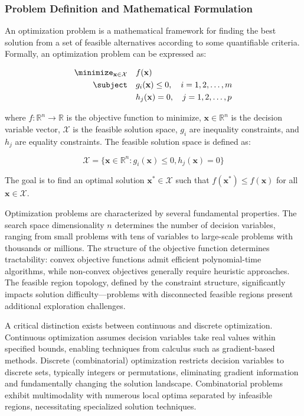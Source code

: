 \subsubsection{Problem Definition and Mathematical Formulation}

An optimization problem is a mathematical framework for finding the best solution from a set of feasible alternatives according to some quantifiable criteria. Formally, an optimization problem can be expressed as:

\begin{equation}
\begin{aligned}
\minimize_{\mathbf{x} \in \mathcal{X}} \quad & f(\mathbf{x}) \\
\subject \quad & g_i(\mathbf{x}) \leq 0, \quad i = 1, 2, \ldots, m \\
& h_j(\mathbf{x}) = 0, \quad j = 1, 2, \ldots, p
\end{aligned}
\end{equation}

where $f: \mathbb{R}^n \to \mathbb{R}$ is the objective function to minimize, $\mathbf{x} \in \mathbb{R}^n$ is the decision variable vector, $\mathcal{X}$ is the feasible solution space, $g_i$ are inequality constraints, and $h_j$ are equality constraints. The feasible solution space is defined as:

\begin{equation}
\mathcal{X} = \{\mathbf{x} \in \mathbb{R}^n : g_i(\mathbf{x}) \leq 0, h_j(\mathbf{x}) = 0\}
\end{equation}

The goal is to find an optimal solution $\mathbf{x}^* \in \mathcal{X}$ such that $f(\mathbf{x}^*) \leq f(\mathbf{x})$ for all $\mathbf{x} \in \mathcal{X}$.

Optimization problems are characterized by several fundamental properties. The search space dimensionality $n$ determines the number of decision variables, ranging from small problems with tens of variables to large-scale problems with thousands or millions. The structure of the objective function determines tractability: convex objective functions admit efficient polynomial-time algorithms, while non-convex objectives generally require heuristic approaches. The feasible region topology, defined by the constraint structure, significantly impacts solution difficulty—problems with disconnected feasible regions present additional exploration challenges.

A critical distinction exists between continuous and discrete optimization. Continuous optimization assumes decision variables take real values within specified bounds, enabling techniques from calculus such as gradient-based methods. Discrete (combinatorial) optimization restricts decision variables to discrete sets, typically integers or permutations, eliminating gradient information and fundamentally changing the solution landscape. Combinatorial problems exhibit multimodality with numerous local optima separated by infeasible regions, necessitating specialized solution techniques.

